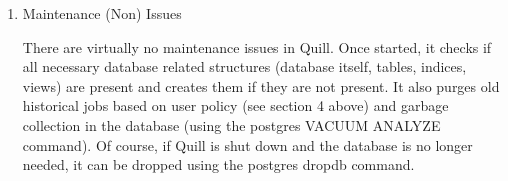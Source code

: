 \begin{enumerate}
\begin{enumerate}
\end{enumerate}

\item Maintenance (Non) Issues

There are virtually no maintenance issues in Quill.  Once started, it
checks if all necessary database related structures (database itself,
tables, indices, views) are present and creates them if they are
not present. It also purges old historical jobs based on user policy
(see section 4 above) and garbage collection in the database (using the
postgres VACUUM ANALYZE command).  Of course, if Quill is shut down and
the database is no longer needed, it can be dropped using the postgres
dropdb command.

\end{enumerate}

